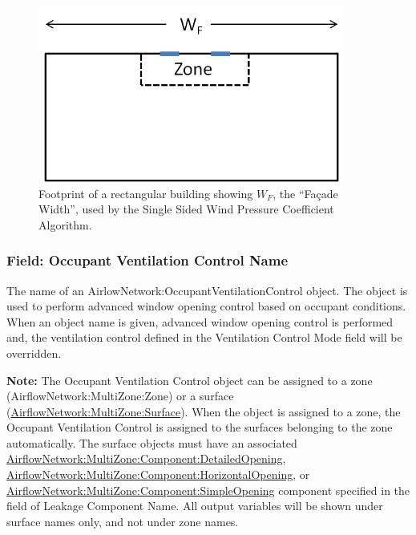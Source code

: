 \begin{figure}[hbtp]
\centering
\includegraphics[width=0.9\textwidth, height=0.9\textheight, keepaspectratio=true]{media/single-sided-footprint.png}
\caption{Footprint of a rectangular building showing $W_F$, the ``Fa\c{c}ade Width'', used by the Single Sided Wind Pressure Coefficient Algorithm. \protect \label{fig:single-sided-footprint}}
\end{figure}

\subsubsection{Field: Occupant Ventilation Control Name}\label{field-occupant-ventilation-control-name}

The name of an AirlowNetwork:OccupantVentilationControl object. The object is used to perform advanced window opening control based on occupant conditions. When an object name is given, advanced window opening control is performed and, the ventilation control defined in the Ventilation Control Mode field will be overridden.

\textbf{Note:} The Occupant Ventilation Control object can be assigned to a zone (AirflowNetwork:MultiZone:Zone) or a surface (\hyperref[airflownetworkmultizonesurface]{AirflowNetwork:MultiZone:Surface}). When the object is assigned to a zone, the Occupant Ventilation Control is assigned to the surfaces belonging to the zone automatically. The surface objects must have an associated \hyperref[airflownetworkmultizonecomponentdetailedopening]{AirflowNetwork:MultiZone:Component:DetailedOpening}, \hyperref[airflownetworkmultizonecomponenthorizontalopening]{AirflowNetwork:MultiZone:Component:HorizontalOpening}, or \hyperref[airflownetworkmultizonecomponentsimpleopening]{AirflowNetwork:MultiZone:Component:SimpleOpening} component specified in the field of Leakage Component Name. All output variables will be shown under surface names only, and not under zone names.

